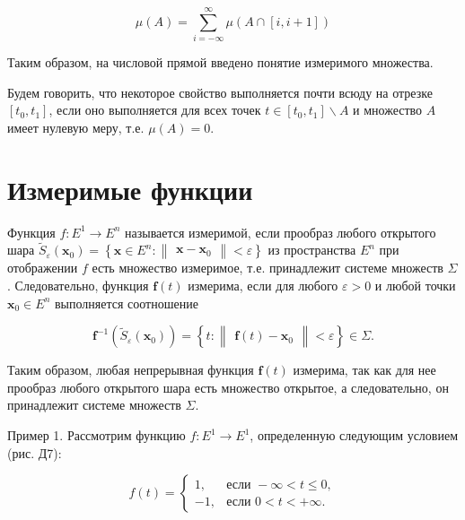 \documentclass[8pt]{extarticle}
\begin{document}
\[
\mu \left( A\right)  = \mathop{\sum }\limits_{{i =  - \infty }}^{\infty }\mu \left( {A \cap  \left\lbrack  {i,i + 1}\right\rbrack  }\right)
\]

Таким образом, на числовой прямой введено понятие измеримого множества.

Будем говорить, что некоторое свойство выполняется почти всюду на отрезке \(\left\lbrack  {{t}_{0},{t}_{1}}\right\rbrack\), если оно выполняется для всех точек \(t \in  \left\lbrack  {{t}_{0},{t}_{1}}\right\rbrack   \smallsetminus  A\) и множество \(A\) имеет нулевую меру, т.е. \(\mu \left( A\right)  = 0\).

\section*{Измеримые функции}

Функция \(f : {E}^{1} \rightarrow  {E}^{n}\) называется измеримой, если прообраз любого открытого шара \({\widetilde{S}}_{\varepsilon }\left( {\mathbf{x}}_{0}\right)  = \left\{  {\mathbf{x} \in  {E}^{n} : \left\lVert \begin{array}{c} {\mathbf{x} - {\mathbf{x}}_{0}} \end{array} \right\rVert < \varepsilon }\right\}\) из пространства \({E}^{n}\) при отображении \(f\) есть множество измеримое, т.е. принадлежит системе множеств \(\Sigma\). Следовательно, функция \(\mathbf{f}\left( t\right)\) измерима, если для любого \(\varepsilon  > 0\) и любой точки \({\mathbf{x}}_{0} \in  {E}^{n}\) выполняется соотношение

\[
{\mathbf{f}}^{-1}\left( {{\widetilde{S}}_{\varepsilon }\left( {\mathbf{x}}_{0}\right) }\right)  = \left\{  {t : \left\lVert \begin{array}{c} {\mathbf{f}\left( t\right)  - {\mathbf{x}}_{0}} \end{array} \right\rVert < \varepsilon }\right\}   \in  \Sigma .
\]

Таким образом, любая непрерывная функция \(\mathbf{f}\left( t\right)\) измерима, так как для нее прообраз любого открытого шара есть множество открытое, а следовательно, он принадлежит системе множеств \(\Sigma\).

Пример 1. Рассмотрим функцию \(f : {E}^{1} \rightarrow  {E}^{1}\), определенную следующим условием (рис. Д7):

\[
f\left( t\right)  = \begin{cases} 1, & \text{если } - \infty  < t \leq  0, \\   - 1, & \text{если } 0 < t <  + \infty . \end{cases}
\]
\end{document}
